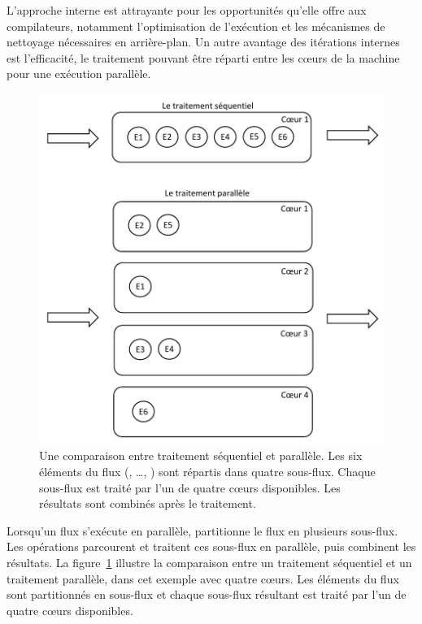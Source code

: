 L'approche interne est attrayante pour les opportunit\'es qu'elle offre aux compilateurs, notamment l'optimisation de l'exécution et les m\'ecanismes de nettoyage n\'ecessaires en arri\`ere-plan. Un autre avantage des it\'erations internes est l'efficacit\'e, le traitement pouvant \^etre r\'eparti entre les cœurs de la machine pour une ex\'ecution parall\`ele.


\begin{figure}
\centering
     \includegraphics[width=1.0\textwidth]{Figures/ComparisonSequentialVsParallel.pdf}
      \caption[Une comparaison entre traitement s\'equentiel et parall\`ele.]{Une comparaison entre traitement s\'equentiel et parall\`ele. Les six \'el\'ements du flux (, \ldots,  ) sont r\'epartis dans quatre sous-flux. Chaque sous-flux est trait\'e par l'un de quatre cœurs disponibles. Les r\'esultats sont combin\'es apr\`es le traitement.}
       \label{ComparisonSequentialVsParallel.fig}
\end{figure}


Lorsqu'un flux s'ex\'ecute en parall\`ele,  partitionne le flux en plusieurs sous-flux. Les op\'erations parcourent et traitent ces sous-flux en parall\`ele, puis combinent les r\'esultats. La figure~\ref{ComparisonSequentialVsParallel.fig} illustre la comparaison entre  un traitement s\'equentiel et un traitement parall\`ele, dans cet exemple avec quatre c\oe{}urs. Les \'el\'ements du flux sont partitionn\'es en sous-flux et chaque sous-flux r\'esultant est trait\'e par l'un de quatre cœurs disponibles.  



